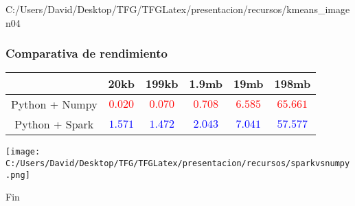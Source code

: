 \documentclass{beamer}
\begin{document}

\begin{frame} %
  {C:/Users/David/Desktop/TFG/TFGLatex/presentacion/recursos/kmeans_imagen}{0}{4}
\end{frame}


\begin{frame}[fragile] %
\frametitle{Comparativa de rendimiento}

\begin{table}[!htbp]\small
  \centering
  \begin{tabular}{|c|c|c|c|c|c|} %
    \hline
    & 20kb & 199kb & 1.9mb & 19mb & 198mb \\ \hline
    Python + Numpy & \textcolor{red}{$0.020$} & \textcolor{red}{$0.070$} & \textcolor{red}{$0.708$} & \textcolor{red}{$6.585$} & \textcolor{red}{$65.661$} \\ \hline
    Python + Spark & \textcolor{blue}{$1.571$} & \textcolor{blue}{$1.472$} & \textcolor{blue}{$2.043$} & \textcolor{blue}{$7.041$} & \textcolor{blue}{$57.577$} \\ \hline
  \end{tabular}
\end{table}

\centering
\texttt{[image: C:/Users/David/Desktop/TFG/TFGLatex/presentacion/recursos/sparkvsnumpy.png]}

\end{frame}


\begin{frame}
\Huge{\centerline{Fin}}
\end{frame}

\end{document}
